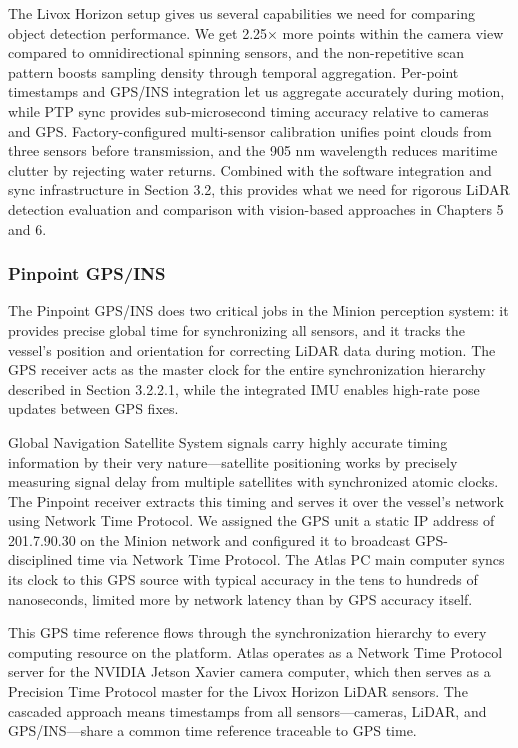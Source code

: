 \documentclass{erauthesis}
\begin{document}
The Livox Horizon setup gives us several capabilities we need for comparing object detection performance.
We get 2.25× more points within the camera view compared to omnidirectional spinning sensors, and the non-repetitive scan pattern boosts sampling density through temporal aggregation.
Per-point timestamps and \ac{GPS}/\ac{INS} integration let us aggregate accurately during motion, while PTP sync provides sub-microsecond timing accuracy relative to cameras and \ac{GPS}.
Factory-configured multi-sensor calibration unifies point clouds from three sensors before transmission, and the 905 nm wavelength reduces maritime clutter by rejecting water returns.
Combined with the software integration and sync infrastructure in Section 3.2, this provides what we need for rigorous \ac{LiDAR} detection evaluation and comparison with vision-based approaches in Chapters 5 and 6.

            \subsubsection{Pinpoint GPS/INS}

The Pinpoint \ac{GPS}/\ac{INS} does two critical jobs in the Minion perception system: it provides precise global time for synchronizing all sensors, and it tracks the vessel's position and orientation for correcting \ac{LiDAR} data during motion.
The \ac{GPS} receiver acts as the master clock for the entire synchronization hierarchy described in Section 3.2.2.1, while the integrated \ac{IMU} enables high-rate pose updates between \ac{GPS} fixes.

Global Navigation Satellite System signals carry highly accurate timing information by their very nature—satellite positioning works by precisely measuring signal delay from multiple satellites with synchronized atomic clocks.
The Pinpoint receiver extracts this timing and serves it over the vessel's network using Network Time Protocol.
We assigned the \ac{GPS} unit a static IP address of 201.7.90.30 on the Minion network and configured it to broadcast \ac{GPS}-disciplined time via Network Time Protocol.
The Atlas PC main computer syncs its clock to this \ac{GPS} source with typical accuracy in the tens to hundreds of nanoseconds, limited more by network latency than by \ac{GPS} accuracy itself.

This \ac{GPS} time reference flows through the synchronization hierarchy to every computing resource on the platform.
Atlas operates as a Network Time Protocol server for the NVIDIA Jetson Xavier camera computer, which then serves as a Precision Time Protocol master for the Livox Horizon \ac{LiDAR} sensors.
The cascaded approach means timestamps from all sensors—cameras, \ac{LiDAR}, and \ac{GPS}/\ac{INS}—share a common time reference traceable to \ac{GPS} time.
\end{document}
